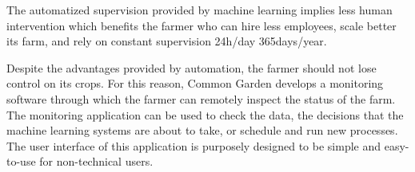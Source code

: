 The automatized supervision provided by machine learning implies less human intervention
which benefits the farmer who can hire less employees, scale better its farm, and rely on constant
supervision 24h/day 365days/year.

Despite the advantages provided by automation, the farmer should not
lose control on its crops. For this reason, Common Garden develops a monitoring software 
through which the farmer can remotely inspect the status of the farm. The monitoring application
can be used to check the data, the decisions that the machine learning systems are about to take, or
schedule and run new processes. The user interface of this application is purposely designed to 
be simple and easy-to-use for non-technical users. 


    
